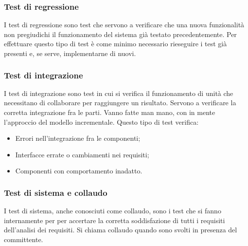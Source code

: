 \documentclass[../main]{subfiles}
\begin{document}
\subsubsection{Test di regressione}
I test di regressione sono test che servono a verificare che una nuova funzionalità non pregiudichi il funzionamento del sistema già testato precedentemente. Per effettuare questo tipo di test è come minimo necessario rieseguire i test già presenti e, se serve, implementarne di nuovi.
\subsubsection{Test di integrazione}
I test di integrazione sono test in cui si verifica il funzionamento di unità che necessitano di collaborare per raggiungere un risultato. Servono a verificare la corretta integrazione fra le parti. Vanno fatte man mano, con in mente l'approccio del modello incrementale.\newline
Questo tipo di test verifica:
\begin{itemize}
    \item Errori nell'integrazione fra le componenti;
    \item Interfacce errate o cambiamenti nei requisiti;
    \item Componenti con comportamento inadatto.
\end{itemize}
\subsubsection{Test di sistema e collaudo}
I test di sistema, anche conosciuti come collaudo, sono i test che si fanno internamente per per accertare la corretta soddisfazione di tutti i requisiti dell'analisi dei requisiti. Si chiama collaudo quando sono svolti in presenza del committente.
\end{document}
